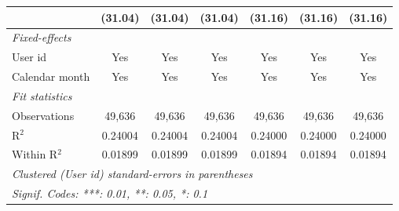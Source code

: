 \begin{table}[htbp]
\begin{footnotesize}
\begin{tabular}{lcccccc}
                                          & (31.04)       & (31.04)       & (31.04)       & (31.16)       & (31.16)       & (31.16)\\
         \midrule \emph{Fixed-effects} &   &   &   &   &   &  \\
         User id                          & Yes           & Yes           & Yes           & Yes           & Yes           & Yes\\
         Calendar month                   & Yes           & Yes           & Yes           & Yes           & Yes           & Yes\\
         \midrule \emph{Fit statistics} &   &   &   &   &   &  \\
         Observations                     & 49,636        & 49,636        & 49,636        & 49,636        & 49,636        & 49,636\\
         R$^2$                            & 0.24004       & 0.24004       & 0.24004       & 0.24000       & 0.24000       & 0.24000\\
         Within R$^2$                     & 0.01899       & 0.01899       & 0.01899       & 0.01894       & 0.01894       & 0.01894\\
         \midrule\midrule\multicolumn{7}{l}{\emph{Clustered (User id) standard-errors in parentheses}}\\
         \multicolumn{7}{l}{\emph{Signif. Codes: ***: 0.01, **: 0.05, *: 0.1}}\\
      \end{tabular}
   \end{footnotesize}
\end{table}


